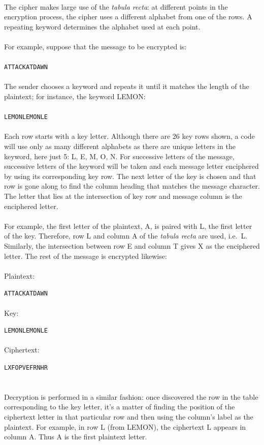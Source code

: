 \documentclass[Lau,binding=0.6cm,oneside]{sapthesis}
\begin{document}
\ \\
The cipher makes large use of the \textit{tabula recta}: at different points in the encryption process, the cipher uses a different alphabet from one of the rows. A repeating keyword determines the alphabet used at each point\supercite{vigenere3}.\\\\
For example, suppose that the message to be encrypted is: \\\\
\colorbox{gray!12}{\small{\texttt{ATTACKATDAWN}}}\\\\
The sender chooses a keyword and repeats it until it matches the length of the plaintext; for instance, the keyword \textsf{LEMON}:\\\\
\colorbox{gray!12}{\small{\texttt{LEMONLEMONLE}}}\\\\
Each row starts with a key letter. Although there are 26 key rows shown, a code will use only as many different alphabets as there are unique letters in the keyword, here just 5: \textsf{L}, \textsf{E}, \textsf{M}, \textsf{O}, \textsf{N}. For successive letters of the message, successive letters of the keyword will be taken and each message letter enciphered by using its corresponding key row. The next letter of the key is chosen and that row is gone along to find the column heading that matches the message character. The letter that lies at the intersection of key row and message column is the enciphered letter.\\\\
For example, the first letter of the plaintext, \textsf{A}, is paired with \textsf{L}, the first letter of the key. Therefore, row \textsf{L} and column \textsf{A} of the \textit{tabula recta} are used, i.e.\ \textsf{L}. Similarly, the intersection between row \textsf{E} and column \textsf{T} gives \textsf{X} as the enciphered letter. The rest of the message is encrypted likewise:\\\\
Plaintext: \par\colorbox{gray!12}{\small{\texttt{ATTACKATDAWN}}}\\\\
Key: \par\colorbox{gray!12}{\small{\texttt{LEMONLEMONLE}}}\\\\
Ciphertext: \par\colorbox{gray!12}{\small{\texttt{LXFOPVEFRNHR}}}\\\\\\
Decryption is performed in a similar fashion: once discovered the row in the table corresponding to the key letter, it's a matter of finding the position of the ciphertext letter in that particular row and then using the column's label as the plaintext. For example, in row \textsf{L} (from \textsf{LEMON}), the ciphertext \textsf{L} appears in column \textsf{A}. Thus \textsf{A} is the first plaintext letter.
\end{document}
